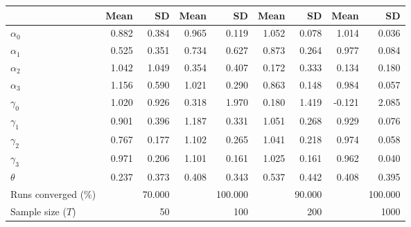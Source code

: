
\begin{tabular}[t]{lrrrrrrrr}
\toprule
  & Mean & SD & Mean  & SD  & Mean   & SD   & Mean    & SD   \\
\midrule
$\alpha_{0}$ & 0.882 & 0.384 & 0.965 & 0.119 & 1.052 & 0.078 & 1.014 & 0.036\\
$\alpha_{1}$ & 0.525 & 0.351 & 0.734 & 0.627 & 0.873 & 0.264 & 0.977 & 0.084\\
$\alpha_{2}$ & 1.042 & 1.049 & 0.354 & 0.407 & 0.172 & 0.333 & 0.134 & 0.180\\
$\alpha_{3}$ & 1.156 & 0.590 & 1.021 & 0.290 & 0.863 & 0.148 & 0.984 & 0.057\\
$\gamma_{0}$ & 1.020 & 0.926 & 0.318 & 1.970 & 0.180 & 1.419 & -0.121 & 2.085\\
$\gamma_{1}$ & 0.901 & 0.396 & 1.187 & 0.331 & 1.051 & 0.268 & 0.929 & 0.076\\
$\gamma_{2}$ & 0.767 & 0.177 & 1.102 & 0.265 & 1.041 & 0.218 & 0.974 & 0.058\\
$\gamma_{3}$ & 0.971 & 0.206 & 1.101 & 0.161 & 1.025 & 0.161 & 0.962 & 0.040\\
$\theta$ & 0.237 & 0.373 & 0.408 & 0.343 & 0.537 & 0.442 & 0.408 & 0.395\\
Runs converged (\%) &  & 70.000 &  & 100.000 &  & 90.000 &  & 100.000\\
Sample size ($T$) &  & 50 &  & 100 &  & 200 &  & 1000\\
\bottomrule
\end{tabular}
